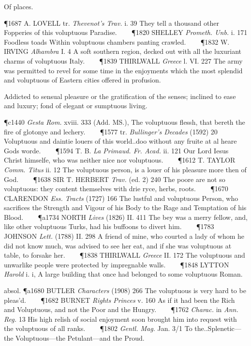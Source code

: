 \begin{description}[wide, labelwidth=!, labelindent=0pt]
\begin{myenumerate}
 Of places.

\P 1687 A. LOVELL tr.  \textit{Thevenot's Trav.} i. 39 They tell a thousand other Fopperies of this voluptuous Paradise.    
\P 1820 SHELLEY  \textit{Prometh. Unb.} i. 171 Foodless toads Within voluptuous chambers panting crawled.    
\P 1832 W. IRVING  \textit{Alhambra} I. 4 A soft southern region, decked out with all the luxuriant charms of voluptuous Italy.    
\P 1839 THIRLWALL  \textit{Greece} l. VI. 227 The army was permitted to revel for some time in the enjoyments which the most splendid and voluptuous of Eastern cities offered in profusion.

 Addicted to sensual pleasure or the gratification of the senses; inclined to ease and luxury; fond of elegant or sumptuous living.

\P c1440 \textit{Gesta  Rom.} xviii. 333 (Add. MS.), The voluptuous flessh, that bereth the fire of glotonye and lechery.    
\P 1577 tr.  \textit{Bullinger's Decades} (1592) 20 Voluptuous and daintie louers of this world..doo without any fruite at al heare Gods worde.    
\P 1594 T. B. \textit{La  Primaud. Fr. Acad.} ii. 121 Our Lord Iesus Christ himselfe, who was neither nice nor voluptuous.    
\P 1612 T. TAYLOR  \textit{Comm. Titus} ii. 12 The voluptuous person, is a louer of his pleasure more then of God.    
\P 1638 SIR T. HERBERT  \textit{Trav.} (ed. 2) 240 The poore are not so voluptuous: they content themselves with drie ryce, herbs, roots.    
\P 1670 CLARENDON  \textit{Ess. Tracts} (1727) 166 The lustful and voluptuous Person, who sacrifices the Strength and Vigour of his Body to the Rage and Temptation of his Blood.    
\P a1734 NORTH  \textit{Lives} (1826) II. 411 The bey was a merry fellow, and, like other voluptuous Turks, had his buffoons to divert him.    
\P 1783 JOHNSON  \textit{Lett.} (1788) II. 298 A friend of mine, who courted a lady of whom he did not know much, was advised to see her eat, and if she was voluptuous at table, to forsake her.    
\P 1838 THIRLWALL  \textit{Greece} II. 172 The voluptuous and unwarlike people were protected by impregnable walls.    
\P 1848 LYTTON  \textit{Harold} i. i, A large building that once had belonged to some voluptuous Roman.

absol. \P a1680 BUTLER  \textit{Characters} (1908) 266 The voluptuous is very hard to be pleas'd.    
\P 1682 BURNET  \textit{Rights Princes} v. 160 As if it had been the Rich and Voluptuous, and not the Poor and the Hungry.    
\P 1762 \textit{Charac.} in  \textit{Ann. Reg.} 13 His high relish of social enjoyment soon brought him into request with the voluptuous of all ranks.    
\P 1802  \textit{Gentl. Mag.} Jan. 3/1 To the..Splenetic—the Voluptuous—the Petulant—and the Proud.


\end{myenumerate}
\end{description}
